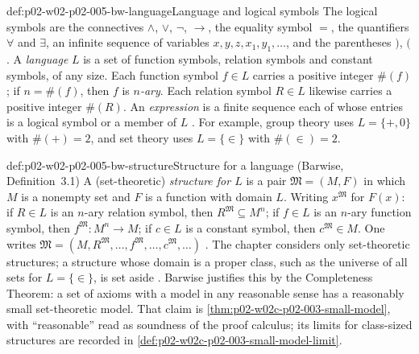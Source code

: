 \begin{hbdefinition}{def:p02-w02-p02-005-bw-language}{Language and logical symbols}
The logical symbols are the connectives \(\land\), \(\lor\), \(\neg\),
\(\to\), the equality symbol \(=\), the quantifiers \(\forall\) and
\(\exists\), an infinite sequence of variables \(x,y,z,x_1,y_1,\ldots\),
and the parentheses \()\), \((\) \cite[ch.~A.1, \S2, pp.~6--7]{Barwise1977FirstOrder}.
A \emph{language} \(L\) is a set of function symbols, relation symbols and
constant symbols, of any size.  Each function symbol \(f\in L\) carries a
positive integer \(\#(f)\); if \(n=\#(f)\), then \(f\) is \emph{\(n\)-ary}.
Each relation symbol \(R\in L\) likewise carries a positive integer
\(\#(R)\).  An \emph{expression} is a finite sequence each of whose entries
is a logical symbol or a member of \(L\)
\cite[ch.~A.1, \S3, pp.~17--18]{Barwise1977FirstOrder}.
For example, group theory uses \(L=\{+,0\}\) with \(\#(+)=2\), and set
theory uses \(L=\{\in\}\) with \(\#(\in)=2\).
\end{hbdefinition}

\begin{hbdefinition}{def:p02-w02-p02-005-bw-structure}{Structure for a language (Barwise, Definition~3.1)}
A (set-theoretic) \emph{structure for \(L\)} is a pair
\(\mathfrak M=(M,F)\) in which \(M\) is a nonempty set and \(F\) is a
function with domain \(L\).  Writing \(x^{\mathfrak M}\) for \(F(x)\):
if \(R\in L\) is an \(n\)-ary relation symbol, then
\(R^{\mathfrak M}\subseteq M^n\); if \(f\in L\) is an \(n\)-ary function
symbol, then \(f^{\mathfrak M}:M^n\to M\); if \(c\in L\) is a constant
symbol, then \(c^{\mathfrak M}\in M\).  One writes
\(\mathfrak M=(M,R^{\mathfrak M},\ldots,f^{\mathfrak M},\ldots,c^{\mathfrak M},\ldots)\)
\cite[ch.~A.1, \S3, Definition~3.1, p.~17]{Barwise1977FirstOrder}.
The chapter considers only set-theoretic structures; a structure whose
domain is a proper class, such as the universe of all sets for
\(L=\{\in\}\), is set aside \cite[ch.~A.1, \S3, pp.~17--18]{Barwise1977FirstOrder}.
Barwise justifies this by the Completeness Theorem: a set of axioms with a
model in any reasonable sense has a reasonably small set-theoretic model.
That claim is \cref{thm:p02-w02c-p02-003-small-model}, with ``reasonable''
read as soundness of the proof calculus; its limits for class-sized
structures are recorded in \cref{def:p02-w02c-p02-003-small-model-limit}.
\end{hbdefinition}

